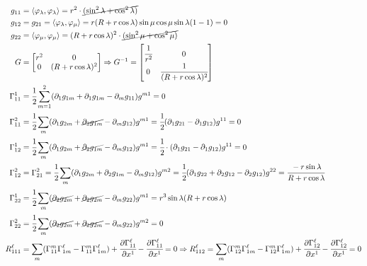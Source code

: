 \documentclass[10pt,a4paper]{article}
\begin{document}
		\begin{align*}
		g_{11} &= \langle \varphi_\lambda, \varphi_\lambda \rangle = r^2 \cdot \cancel{(\sin^2 \lambda + \cos^2 \lambda)} \\
		g_{12} &= g_{21} = \langle \varphi_\lambda, \varphi_\mu \rangle = r (R + r \cos \lambda) \sin \mu \cos \mu \sin \lambda (1 - 1) = 0 \\
		g_{22} &= \langle \varphi_\mu, \varphi_\mu \rangle = (R + r \cos \lambda)^2 \cdot \cancel{(\sin^2 \mu + \cos^2 \mu)} \\
		G &= \left[ \begin{matrix} r^2 & 0 \\ 0 & (R + r \cos \lambda)^2 \end{matrix} \right] \Rightarrow G^{-1} = \left[ \begin{matrix} \cfrac{1}{r^2} & 0 \\ 0 & \cfrac{1}{(R + r \cos \lambda)^2} \end{matrix} \right] \\
		\Gamma_{11}^1 &= \cfrac{1}{2} \sum_{m = 1}^2 (\partial_1 g_{1m} + \partial_1 g_{1m} - \partial_m g_{11}) g^{m1} = 0 \\
		\Gamma_{11}^2 &= \cfrac{1}{2} \sum_m (\partial_1 g_{2m} + \cancel{\partial_2 g_{1m}} - \partial_m g_{12}) g^{m1} = \cfrac{1}{2} (\partial_1 g_{21} - \partial_1 g_{12}) g^{11} = 0 \\
		\Gamma_{12}^1 &= \cfrac{1}{2} \sum_m (\partial_1 g_{2m} + \cancel{\partial_2 g_{1m}} - \partial_m g_{12}) g^{m1} = \cfrac{1}{2} \cdot (\partial_1 g_{21} - \partial_1 g_{12}) g^{11} = 0 \\
		\Gamma_{12}^2 &= \Gamma_{21}^2 = \cfrac{1}{2} \sum_m (\partial_1 g_{2m} + \partial_2 g_{1m} - \partial_m g_{12}) g^{m2} = \cfrac{1}{2} (\partial_1 g_{22} + \partial_2 g_{12} - \partial_2 g_{12}) g^{22} = \cfrac{- r \sin \lambda}{R + r \cos \lambda} \\
		\Gamma_{22}^1 &= \cfrac{1}{2} \sum_m (\cancel{\partial_2 g_{2m}} + \cancel{\partial_2 g_{2m}} - \partial_m g_{22}) g^{m1} = r^3 \sin \lambda (R + r \cos \lambda) \\
		\Gamma_{22}^2 &= \cfrac{1}{2} \sum_m (\cancel{\partial_2 g_{2m}} + \cancel{\partial_2 g_{2m}} - \partial_m g_{22}) g^{m2} = 0 \\
		R_{111}^\ell &= \sum_m (\Gamma_{11}^m \Gamma_{1m}^\ell - \Gamma_{11}^m \Gamma_{1m}^\ell) + \cfrac{\partial \Gamma_{11}^\ell}{\partial x^1} - \cfrac{\partial \Gamma_{11}^\ell}{\partial x^1} = 0 \Rightarrow R_{112}^\ell = \sum_m (\Gamma_{12}^m \Gamma_{1m}^\ell - \Gamma_{12}^m \Gamma_{1m}^\ell) + \cfrac{\partial \Gamma_{12}^\ell}{\partial x^1} - \cfrac{\partial \Gamma_{12}^\ell}{\partial x^1} = 0 \\

\end{align*}
\end{document}
